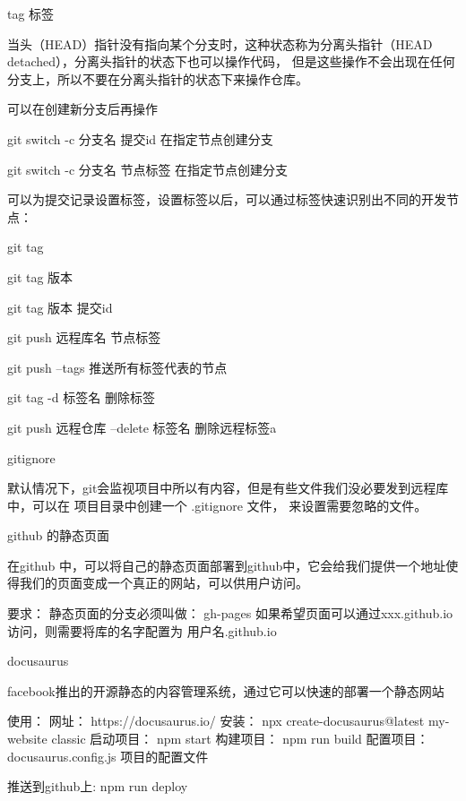        tag  标签

        当头（HEAD）指针没有指向某个分支时，这种状态称为分离头指针（HEAD detached），分离头指针的状态下也可以操作代码，
        但是这些操作不会出现在任何分支上，所以不要在分离头指针的状态下来操作仓库。

        可以在创建新分支后再操作

        git switch -c 分支名  提交id   在指定节点创建分支

        git switch -c 分支名  节点标签  在指定节点创建分支

        可以为提交记录设置标签，设置标签以后，可以通过标签快速识别出不同的开发节点：

        git tag

        git tag 版本

        git tag 版本 提交id

        git push 远程库名 节点标签

        git push --tags     推送所有标签代表的节点

        git tag -d 标签名   删除标签

        git push 远程仓库 --delete 标签名   删除远程标签a

        gitignore

        默认情况下，git会监视项目中所以有内容，但是有些文件我们没必要发到远程库中，可以在
        项目目录中创建一个  .gitignore 文件， 来设置需要忽略的文件。

        github 的静态页面

        在github 中，可以将自己的静态页面部署到github中，它会给我们提供一个地址使得我们的页面变成一个真正的网站，可以供用户访问。
        
        要求：
            静态页面的分支必须叫做： gh-pages
            如果希望页面可以通过xxx.github.io 访问，则需要将库的名字配置为  用户名.github.io

        
        docusaurus

        facebook推出的开源静态的内容管理系统，通过它可以快速的部署一个静态网站

        使用：
            网址：
                https://docusaurus.io/
            安装：
                npx create-docusaurus@latest my-website classic
            启动项目：
                npm start 
            构建项目：
                npm run build
            配置项目：
                docusaurus.config.js    项目的配置文件

            推送到github上:
                npm run deploy

